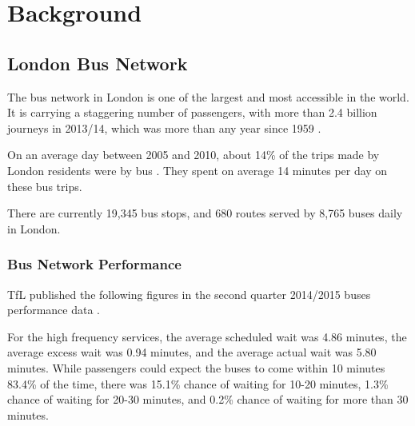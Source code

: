 \chapter{Background}


\section{London Bus Network}

\par The bus network in London is one of the largest and most accessible in the world. It is carrying a staggering
number of passengers, with more than 2.4
billion journeys in 2013/14, which was more than any year since 1959 \cite{tfl_annual_report_13/14}. 

\par On an average day between 2005 and 2010, about 14\% of the trips made by London residents were by bus \cite{tfl_ltds}. They spent on average 14 minutes per day on these bus trips.

\par There are currently 19,345 bus stops, and 680 routes served by 8,765 buses daily in London\cite{bus_stop_locations_routes}.


\subsection{Bus Network Performance}

\par TfL published the following figures in the second quarter 2014/2015 buses performance data \cite{buses_performance_report}.

\par For the high frequency services, the average scheduled wait was 4.86 minutes, the average excess wait was 0.94 minutes, and the average actual wait was 5.80 minutes. While passengers could expect the buses to come within 10 minutes 83.4\% of the time, there was 15.1\% chance of waiting for 10-20 minutes, 1.3\% chance of waiting for 20-30 minutes, and 0.2\% chance of waiting for more than 30 minutes.

